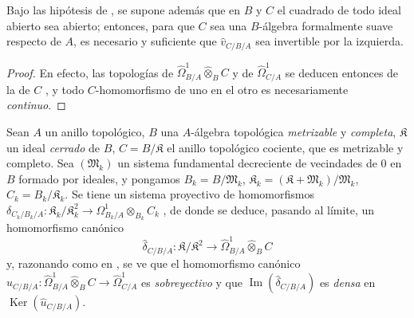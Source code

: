 \begin{corollary}[20.7.19]
\label{0.20.7.19-fr}
Bajo las hipótesis de \textup{}, se supone además que en $B$ y
$C$ el cuadrado de todo ideal abierto sea abierto; entonces, para que $C$ sea
una $B$-álgebra formalmente suave respecto de $A$, es necesario y suficiente
que $\widehat v_{C/B/A}$ sea invertible por la izquierda.
\end{corollary}

\begin{proof}
En efecto, las topologías de
$\widehat{\Omega}^1_{B/A}\widehat\otimes_B C$ y de
$\widehat{\Omega}^1_{C/A}$ se deducen entonces de la de $C$
, y todo $C$-homomorfismo de uno en el otro es
necesariamente \emph{continuo}.
\end{proof}

\begin{env}[20.7.20]
\label{0.20.7.20-fr}
Sean $A$ un anillo topológico, $B$ una $A$-álgebra topológica
\emph{metrizable} y \emph{completa}, $\mathfrak{K}$ un ideal \emph{cerrado} de $B$,
$C=B/\mathfrak{K}$ el anillo topológico cociente, que es metrizable y
completo. Sea $(\mathfrak{M}_k)$ un sistema fundamental decreciente de
vecindades de $0$ en $B$ formado por ideales, y pongamos
$B_k=B/\mathfrak{M}_k$,
$\mathfrak{K}_k=(\mathfrak{K}+\mathfrak{M}_k)/\mathfrak{M}_k$,
$C_k=B_k/\mathfrak{K}_k$. Se tiene un sistema proyectivo de homomorfismos
$\delta_{C_k/B_k/A}:\mathfrak{K}_k/\mathfrak{K}_k^2\to\Omega^1_{B_k/A}\otimes_{B_k}C_k$
, de donde se deduce, pasando al límite, un
homomorfismo canónico
\[
  \widehat\delta_{C/B/A}:\mathfrak{K}/\mathfrak{K}^2\to
  \widehat{\Omega}^1_{B/A}\widehat\otimes_B C
\]
y, razonando como en , se ve que el homomorfismo canónico
$\widehat u_{C/B/A}:\widehat{\Omega}^1_{B/A}
\widehat\otimes_B C\to\widehat{\Omega}^1_{C/A}$ es
\emph{sobreyectivo} y que $\operatorname{Im}(\widehat\delta_{C/B/A})$ es
\emph{densa} en $\operatorname{Ker}(\widehat u_{C/B/A})$.
\end{env}
